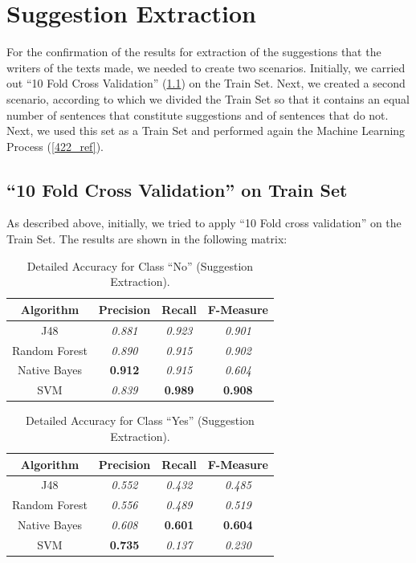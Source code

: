\section{Suggestion Extraction}\label{42_ref}
For the confirmation of the results for extraction of the suggestions that the writers of the texts made, we needed to create two scenarios. Initially, we carried out ``10 Fold Cross Validation'' (\ref{421_ref}) on the Train Set. Next, we created a second scenario, according to which we divided the Train Set so that it contains an equal number of sentences that constitute suggestions and of sentences that do not. Next, we used this set as a Train Set and performed again the Machine Learning Process (\ref{422_ref}).

\subsection{``10 Fold Cross Validation'' on Train Set}\label{421_ref}
As described above, initially, we tried to apply ``10 Fold cross validation'' on the  Train Set. The results are shown in the following matrix:

\begin{table}[H]
\centering
\caption{Detailed Accuracy for Class “No” (Suggestion Extraction).}
\label{45_table_ref}
\begin{tabular}{cccc}
\hline
{\bf Algorithm} & {\bf Precision} & {\bf Recall} & {\bf F-Measure} \\ \hline
J48             & {\it 0.881}     & {\it 0.923}  & {\it 0.901}     \\
Random Forest   & {\it 0.890}      & {\it 0.915}  & {\it 0.902}     \\
Native Bayes    & {\bf 0.912}     & {\it 0.915}  & {\it 0.604}     \\
SVM             & {\it 0.839}     & {\bf 0.989}  & {\bf 0.908}     \\ \hline
\end{tabular}
\end{table}

\begin{table}[H]
\centering
\caption{Detailed Accuracy for Class “Yes” (Suggestion Extraction).}
\label{46_table_ref}
\begin{tabular}{cccc}
\hline
{\bf Algorithm} & {\bf Precision} & {\bf Recall} & {\bf F-Measure} \\ \hline
J48             & {\it 0.552}     & {\it 0.432}  & {\it 0.485}     \\
Random Forest   & {\it 0.556}     & {\it 0.489}  & {\it 0.519}     \\
Native Bayes    & {\it 0.608}     & {\bf 0.601}  & {\bf 0.604}     \\
SVM             & {\bf 0.735}     & {\it 0.137}  & {\it 0.230}     \\ \hline
\end{tabular}
\end{table}

